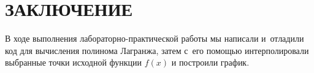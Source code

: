 \documentclass[14pt]{extarticle}
\begin{document}

\clearpage

\section{\MakeUppercase{Заключение}}

В ходе выполнения лабораторно-практичес\-кой работы мы написали и~отладили код для вычисления полинома Лагранжа, затем с~его помощью интерполировали выбранные точки исходной функции $f(x)$ и построили график.
\end{document}
